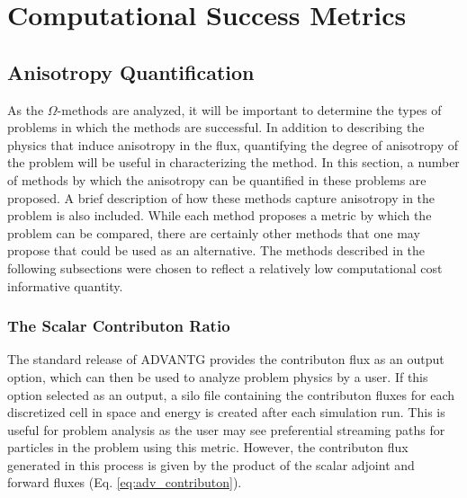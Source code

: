\newcommand{\anglevars}{x,y,z,E_g,\theta,\varphi}
\newcommand{\scalarvars}{x,y,z,E_g}


\section{Computational Success Metrics}
\label{sec:successmetrics}
\subsection{Anisotropy Quantification}
\label{sec:anisotropy_quant}

As the $\Omega$-methods are analyzed, it will be important to determine the
types of problems in which the methods are successful. In addition to describing
the physics that induce anisotropy in the flux, quantifying the degree of
anisotropy of the problem will be useful in characterizing the method. In this
section, a number
of methods by which the anisotropy can be quantified in these problems are
proposed. A brief description of how these methods capture anisotropy in the
problem is also included. While each method proposes a metric by which the
problem can be compared, there are certainly other methods that one may propose
that could be used as an alternative. The methods described in the following
subsections were chosen to reflect a relatively low computational cost
informative quantity.

\subsubsection{The Scalar Contributon Ratio}

The standard release of ADVANTG provides the contributon flux as an output
option, which can then be used to analyze problem physics by a user.
If this option selected as an output, a silo file containing
the contributon fluxes for each discretized cell in space and energy  is
created after
each simulation run. This is useful for problem analysis as the user may see
preferential streaming paths for particles in the problem using this metric.
However, the contributon flux generated in this process is given by the product
of the scalar adjoint and forward fluxes (Eq. \ref{eq:adv_contributon}).

